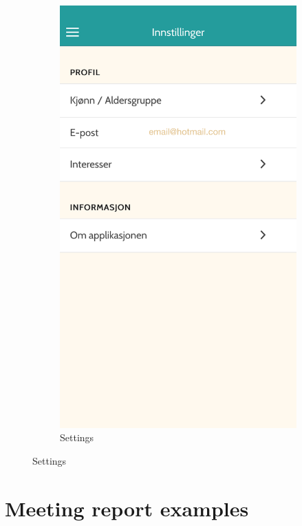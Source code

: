 \begin{appendices}
\begin{figure}[h]
\begin{subfigure}[h]{0.3\textwidth}
			\includegraphics[width=\textwidth]{fig/screenshot_settings}
			\caption{Settings}
		\end{subfigure}
	\end{figure}
	
\chapter{Meeting report examples}

	

	

\end{appendices}
\cleardoublepage
